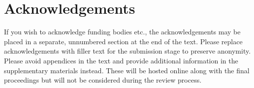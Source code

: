 \documentclass{evolang}
\begin{document}
\section*{Acknowledgements}

If you wish to acknowledge funding bodies etc., the acknowledgements may be placed in a separate, unnumbered section at the end of the text. Please replace acknowledgements with filler text for the submission stage to preserve anonymity. Please avoid appendices in the text and provide additional information in the supplementary materials instead. These will be hosted online along with the final proceedings but will not be considered during the review process.



 
\end{document}
